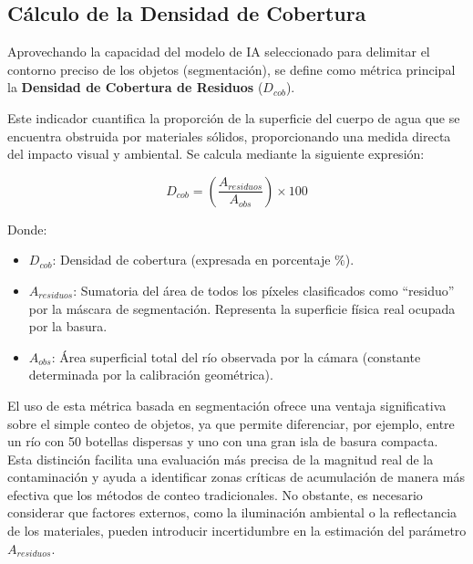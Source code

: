\subsection{Cálculo de la Densidad de Cobertura}
\label{subsec:calculo_densidad}

Aprovechando la capacidad del modelo de IA seleccionado para delimitar el contorno preciso de los objetos (segmentación), se define como métrica principal la \textbf{Densidad de Cobertura de Residuos} ($D_{cob}$).

Este indicador cuantifica la proporción de la superficie del cuerpo de agua que se encuentra obstruida por materiales sólidos, proporcionando una medida directa del impacto visual y ambiental. Se calcula mediante la siguiente expresión:

\begin{equation} \label{eq:densidad_cobertura}
D_{cob} = \left( \frac{A_{residuos}}{A_{obs}} \right) \times 100
\end{equation}

Donde:
\begin{itemize}
    \item $D_{cob}$: Densidad de cobertura (expresada en porcentaje $\%$).
    \item $A_{residuos}$: Sumatoria del área de todos los píxeles clasificados como ``residuo'' por la máscara de segmentación. Representa la superficie física real ocupada por la basura.
    \item $A_{obs}$: Área superficial total del río observada por la cámara (constante determinada por la calibración geométrica).
\end{itemize}
El uso de esta métrica basada en segmentación ofrece una ventaja significativa sobre el simple conteo de objetos, ya que permite diferenciar, por ejemplo, entre un río con 50 botellas dispersas y uno con una gran isla de basura compacta. Esta distinción facilita una evaluación más precisa de la magnitud real de la contaminación y ayuda a identificar zonas críticas de acumulación de manera más efectiva que los métodos de conteo tradicionales. No obstante, es necesario considerar que factores externos, como la iluminación ambiental o la reflectancia de los materiales, pueden introducir incertidumbre en la estimación del parámetro $A_{residuos}$.

